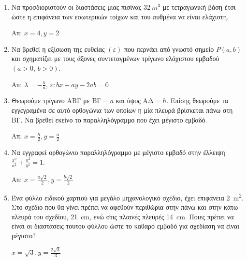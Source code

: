 




\everymath{\displaystyle}
\thispagestyle{askhseis}



\begin{center}
  \minibox{\large \bfseries \textcolor{Col1}{Προβλήματα Ακροτάτων}}
\end{center}

\vspace{\baselineskip}

\begin{enumerate}

	\item  Να προσδιοριστούν οι διαστάσεις μιας πισίνας $ \SI{32}{m^{3}} $ με
		τετραγωνική βάση έτσι ώστε η επιφάνεια των εσωτερικών τοίχων και του
		πυθμένα να είναι ελάχιστη. 

		\hfill Απ: $x=4, y=2$

	\item  Να βρεθεί η εξίσωση της ευθείας $ (\varepsilon)
		$ που περνάει από γνωστό σημείο $ P(a,b) $ και σχηματίζει με τους άξονες
		συντεταγμένων τρίγωνο ελάχιστου εμβαδού $ (a>0,\, b>0) $.

		\hfill Απ: $ \lambda = -\frac{b}{a} $, $\varepsilon: bx + ay - 2ab = 0$

	\item Θεωρούμε τρίγωνο ΑΒΓ με  ΒΓ$=a $ και ύψος ΑΔ$=h$. Επίσης θεωρούμε τα
		εγγεγραμένα σε αυτό ορθογώνια των οποίων η μία πλευρά βρίσκεται πάνω στη
		ΒΓ. Να βρεθεί εκείνο το παραλληλόγραμμο που έχει μέγιστο εμβαδό.
		
		\hfill Απ: $ x = \frac{h}{2}, y= \frac{a}{2} $

	\item Να εγγραφεί ορθογώνιο παραλληλόγραμμο με μέγιστο εμβαδό στην έλλειψη $
		\frac{x^{2}}{a^{2}} + \frac{y^{2}}{b^{2}} = 1 $. 

		\hfill Απ: $ x = \frac{a\sqrt{2}}{2}, y = \frac{b \sqrt{2}}{2} $

	\item Ένα φύλλο ειδικού χαρτιού για μεγάλο μηχανολογικό σχέδιο, έχει
		επιφάνεια \SI{2}{m^{2}}. Στο σχέδιο που θα γίνει πρέπει να αφεθούν
		περιθώρια στην πάνω και στην κάτω πλευρά του σχεδίου, \SI{21}{cm}, ενώ
		στις πλαινές πλευρές \SI{14}{cm}. Ποιες πρέπει να είναι οι διαστάσεις
		τουτου φύλλου ώστε το καθαρό εμβαδό για σχεδίαση να είναι μέγιστο?

		\hfill $ x = \sqrt{3}, y = \frac{2 \sqrt{3}}{3} $


\end{enumerate}
